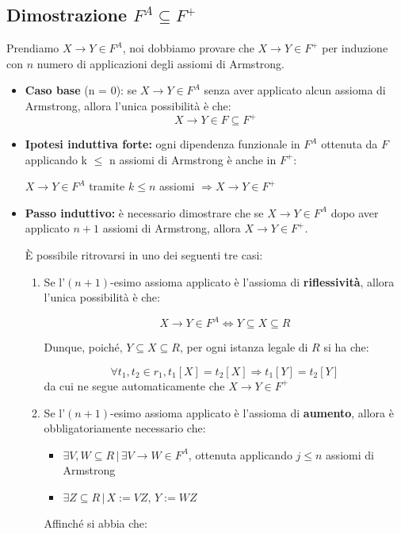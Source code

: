 \documentclass{article}
\begin{document}
\subsection{Dimostrazione $F^{A} \subseteq F^{+}$}
Prendiamo $X \rightarrow Y \in F^{A}$, noi dobbiamo provare che $X \rightarrow Y \in F^{+}$ per induzione con $n$ numero di applicazioni degli assiomi di Armstrong.
\begin{itemize}
  \item \textbf{Caso base} (n = 0): se $X \rightarrow Y \in F^{A}$ senza aver applicato alcun assioma di Armstrong, allora l'unica possibilità è che:
  \[X \rightarrow Y \in F \subseteq F^{+}\]

  \item \textbf{Ipotesi induttiva forte:} ogni dipendenza funzionale in $F^{A}$ ottenuta da $F$
  applicando k $\leq$ n assiomi di Armstrong è anche in $F^{+}$:
  \begin{center}
    $X \rightarrow Y \in F^{A}$ tramite $k \leq n$ assiomi $\Rightarrow X \rightarrow Y \in F^{+}$
  \end{center}
  \item \textbf{Passo induttivo:} è necessario dimostrare che se $X \rightarrow Y \in F^{A}$ dopo aver applicato $n +1$ assiomi di Armstrong, allora $ X \rightarrow Y \in F^{+}$.\par
  È possibile ritrovarsi in uno dei seguenti tre casi:
  \begin{enumerate}
    \item Se l'$(n + 1)$-esimo assioma applicato è l'assioma di \textbf{riflessività}, allora l'unica possibilità è che:

    \[X \rightarrow Y \in F^{A} \Leftrightarrow Y \subseteq X \subseteq R\]

    Dunque, poiché, $Y \subseteq X \subseteq R$, per ogni istanza legale di $R$ si ha che:

    \[\forall t_1, t_2 \in r_{1}, t_1[X] = t_2[X] \Rightarrow t_1[Y] = t_2[Y]\]
    da cui ne segue automaticamente che $X \rightarrow Y \in F^{+}$
    \item Se l'$(n + 1)$-esimo assioma applicato è l'assioma di \textbf{aumento}, allora è obbligatoriamente necessario che:
    \begin{itemize}
      \item $\exists V, W \subseteq R \, | \, \exists V \rightarrow W \in F^{A}$, ottenuta applicando $j \leq n$ assiomi di Armstrong\\

      \item $\exists Z \subseteq R \, | \, X := VZ, \, Y := WZ$\\
    \end{itemize}
      Affinché si abbia che:


\end{enumerate}
\end{itemize}
\end{document}
